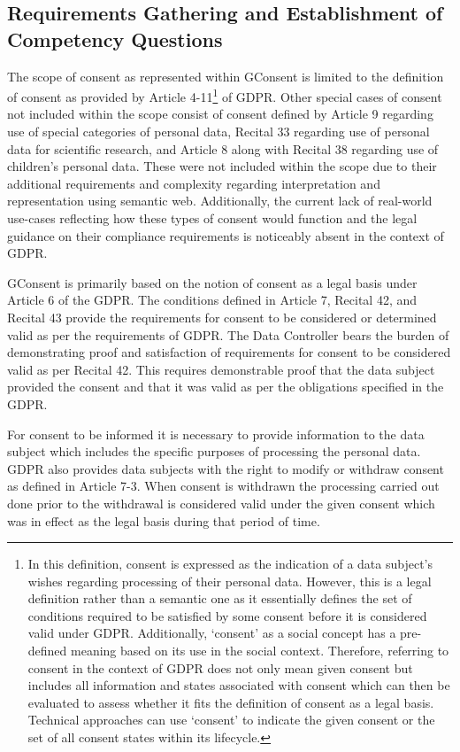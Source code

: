 \subsection{Requirements Gathering and Establishment of Competency Questions}
The scope of consent as represented within GConsent is limited to the definition of consent as provided by Article 4-11\footnote{In this definition, consent is expressed as the indication of a data subject's wishes regarding processing of their personal data. However, this is a legal definition rather than a semantic one as it essentially defines the set of conditions required to be satisfied by some consent before it is considered valid under GDPR. Additionally, `consent' as a social concept has a pre-defined meaning based on its use in the social context. Therefore, referring to consent in the context of GDPR does not only mean given consent but includes all information and states associated with consent which can then be evaluated to assess whether it fits the definition of consent as a legal basis. Technical approaches can use `consent' to indicate the given consent or the set of all consent states within its lifecycle.} of GDPR. 
Other special cases of consent not included within the scope consist of consent defined by Article 9 regarding use of special categories of personal data, Recital 33 regarding use of personal data for scientific research, and Article 8 along with Recital 38 regarding use of children’s personal data.
These were not included within the scope due to their additional requirements and complexity regarding interpretation and representation using semantic web. Additionally, the current lack of real-world use-cases reflecting how these types of consent would function and the legal guidance on their compliance requirements is noticeably absent in the context of GDPR.

GConsent is primarily based on the notion of consent as a legal basis under Article 6 of the GDPR. The conditions defined in Article 7, Recital 42, and Recital 43 provide the requirements for consent to be considered or determined valid as per the requirements of GDPR.
The Data Controller bears the burden of demonstrating proof and satisfaction of requirements for consent to be considered valid as per Recital 42. This requires demonstrable proof that the data subject provided the consent and that it was valid as per the obligations specified in the GDPR.

For consent to be informed it is necessary to provide information to the data subject which includes the specific purposes of processing the personal data.
GDPR also provides data subjects with the right to modify or withdraw consent as defined in Article 7-3.
When consent is withdrawn the processing carried out done prior to the withdrawal is considered valid under the given consent which was in effect as the legal basis during that period of time.

